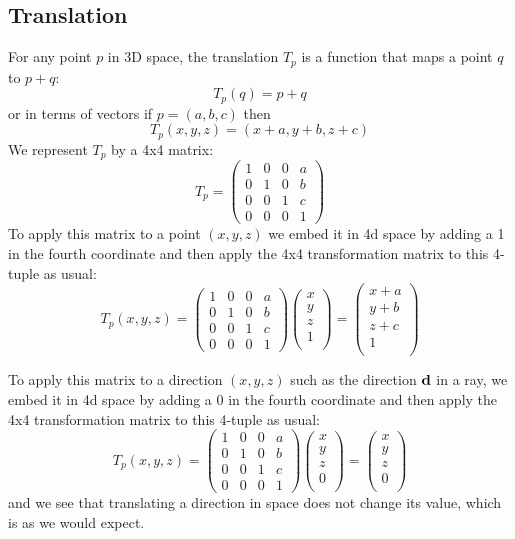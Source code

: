 \documentclass{book}
\newcommand{\vect}[1]{{\bf{ #1}}}
\begin{document}
\subsection{Translation}
For any point $p$ in 3D space, the translation $T_p$ is a function that maps a point $q$ to $p+q$:
\[
T_p(q) = p+q
\]
or in terms of vectors if $p = (a,b,c)$ then
\[
T_p(x,y,z) = (x+a, y+b, z+c)
\]
We represent $T_p$ by a 4x4 matrix:
\[
T_p =
\left (
\begin{array}{cccc}
1 & 0 & 0 & a \\
0 & 1 & 0 & b \\
0 & 0 & 1 & c \\
0 & 0 & 0 & 1
\end{array}
\right )
\]
To apply this matrix to a point $(x,y,z)$ we embed it in 4d space by adding a 1 in the fourth coordinate
and then apply the 4x4 transformation matrix to this 4-tuple as usual:
\[
T_p(x,y,z) =
\left (
\begin{array}{cccc}
1 & 0 & 0 & a \\
0 & 1 & 0 & b \\
0 & 0 & 1 & c \\
0 & 0 & 0 & 1
\end{array}
\right )
\left (
\begin{array}{c}
x \\
y \\
z \\
1 \\
\end{array}
\right )
=
\left (
\begin{array}{c}
x+a \\
y+b \\
z+c \\
1 \\
\end{array}
\right )
\]

To apply this matrix to a direction $(x,y,z)$ such as the direction $\vect{d}$ in a ray,
we embed it in 4d space by adding a 0 in the fourth coordinate
and then apply the 4x4 transformation matrix to this 4-tuple as usual:
\[
T_p(x,y,z) =
\left (
\begin{array}{cccc}
1 & 0 & 0 & a \\
0 & 1 & 0 & b \\
0 & 0 & 1 & c \\
0 & 0 & 0 & 1
\end{array}
\right )
\left (
\begin{array}{c}
x \\
y \\
z \\
0 \\
\end{array}
\right )
=
\left (
\begin{array}{c}
x \\
y \\
z \\
0 \\
\end{array}
\right )
\]
and we see that translating a direction in space does not change its value,
which is as we would expect.
\end{document}
